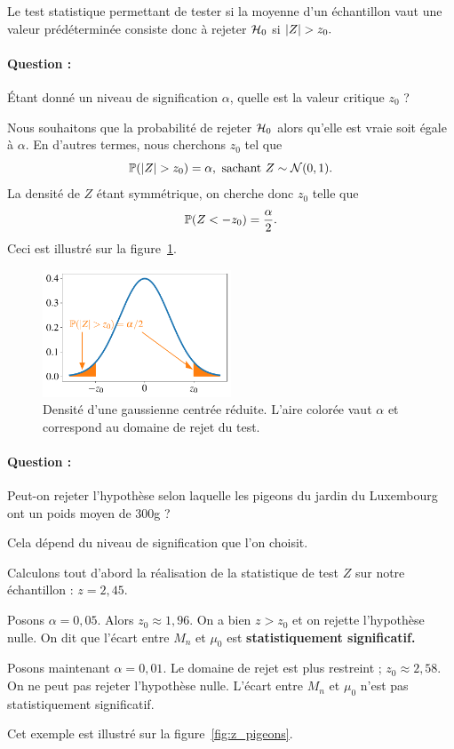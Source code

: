Le test statistique permettant de tester si la moyenne d'un échantillon vaut
une valeur prédéterminée consiste donc à rejeter $\mathcal{H}_0$ si $\lvert Z\rvert > z_0.$

\paragraph{Question : } Étant donné un niveau de signification $\alpha$, quelle
est la valeur critique $z_0$ ?
\begin{answer}
  Nous souhaitons que la probabilité de rejeter $\mathcal{H}_0$ alors qu'elle est vraie
  soit égale à $\alpha.$ En d'autres termes, nous cherchons $z_0$ tel que
  \[
    \mathbb{P}(\lvert Z\rvert > z_0) = \alpha, \text{ sachant } Z \sim \mathcal{N}(0, 1).
  \]
  La densité de $Z$ étant symmétrique, on cherche donc $z_0$ telle que 
  \[
    \mathbb{P}(Z < -z_0) = \frac{\alpha}{2}.
  \]
  Ceci est illustré sur la figure~\ref{fig:z_moyenne}.  
\end{answer}

\begin{figure}[h]
  \centering
  \includegraphics[width=0.5\textwidth]{figures/tests/z_moyenne}
  \caption{Densité d'une gaussienne centrée réduite. L'aire colorée vaut
    $\alpha$ et correspond au domaine de rejet du test.}
  \label{fig:z_moyenne}
\end{figure}

\paragraph{Question :} Peut-on rejeter l'hypothèse selon laquelle les pigeons
du jardin du Luxembourg ont un poids moyen de 300g ?
\begin{answer}
  Cela dépend du niveau de signification que l'on choisit.

  Calculons tout d'abord la réalisation de la statistique de test $Z$ sur notre
  échantillon : $z = 2,45.$

  Posons $\alpha = 0,05.$ Alors $z_0 \approx 1,96.$ On a bien $z > z_0$ et on
  rejette l'hypothèse nulle. On dit que l'écart entre $M_n$ et $\mu_0$ est
  \textbf{statistiquement significatif.}

  Posons maintenant $\alpha = 0,01.$ Le domaine de rejet est plus restreint ;
  $z_0 \approx 2,58.$ On ne peut pas rejeter l'hypothèse nulle. L'écart entre
  $M_n$ et $\mu_0$ n'est pas statistiquement significatif.


  Cet exemple est illustré sur la figure~\ref{fig:z_pigeons}.
\end{answer}


